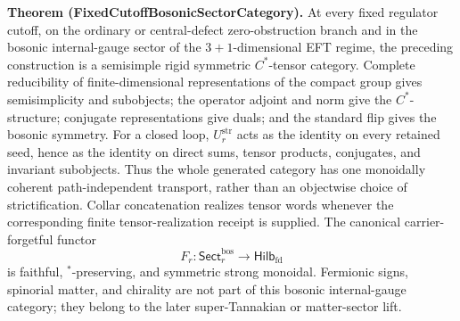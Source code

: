 \textbf{Theorem (FixedCutoffBosonicSectorCategory).} At every fixed regulator cutoff, on the ordinary or central-defect zero-obstruction branch and in the bosonic internal-gauge sector of the \(3+1\)-dimensional EFT regime, the preceding construction is a semisimple rigid symmetric \(C^*\)-tensor category. Complete reducibility of finite-dimensional representations of the compact group gives semisimplicity and subobjects; the operator adjoint and norm give the \(C^*\)-structure; conjugate representations give duals; and the standard flip gives the bosonic symmetry. For a closed loop, \(U^{\mathrm{str}}_r\) acts as the identity on every retained seed, hence as the identity on direct sums, tensor products, conjugates, and invariant subobjects. Thus the whole generated category has one monoidally coherent path-independent transport, rather than an objectwise choice of strictification. Collar concatenation realizes tensor words whenever the corresponding finite tensor-realization receipt is supplied. The canonical carrier-forgetful functor
\[
F_r:\mathsf{Sect}^{\mathrm{bos}}_r\longrightarrow\mathsf{Hilb}_{\mathrm{fd}}
\]
is faithful, \(^*\)-preserving, and symmetric strong monoidal. Fermionic signs, spinorial matter, and chirality are not part of this bosonic internal-gauge category; they belong to the later super-Tannakian or matter-sector lift.

